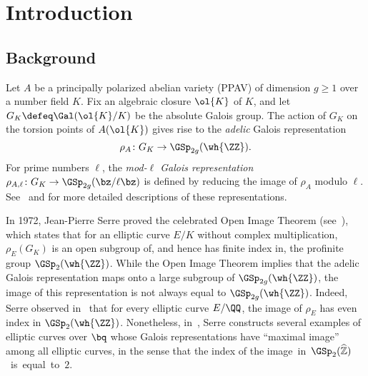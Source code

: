 \section{Introduction}
\subsection{Background}
\label{subsection:intro-background}
Let $A$ be a principally polarized abelian variety (PPAV) of dimension $g \geq 1$
over a number field $K$.
Fix an algebraic closure $\ol{K}$ of $K$, and let $G_K \defeq \Gal(\ol{K}/K)$ be the absolute Galois group. 
The action of $G_K$ on the torsion points of $A(\ol{K})$ gives rise to the 
\emph{adelic} Galois representation
$$\rho_A \colon G_K \to\GSp_{2g}(\wh{\ZZ}).$$
For prime numbers $\ell$, the \emph{mod-$\ell$ Galois representation} $\rho_{A,\ell} \colon G_K \to \GSp_{2g}(\bz/\ell\bz)$ is defined by reducing the image of $\rho_A$ modulo $\ell$.
See~\cite[Section 2.2]{seaweed} and
\cite[Section 3.1]{landesman-swaminathan-tao-xu:rational-families} for more detailed descriptions of these representations.

In 1972, Jean-Pierre Serre proved the celebrated Open Image Theorem (see~\cite{causalrelationship}), which states that for an elliptic curve $E/K$ without complex multiplication, $\rho_E(G_K)$ is an open subgroup of, and hence has finite index in, the profinite group $\GSp_{2}(\wh{\ZZ})$. 
While the Open Image Theorem implies that the adelic Galois representation maps onto a large subgroup of $\GSp_{2g}(\wh{\ZZ})$, the image of this representation is not always equal to $\GSp_{2g}(\wh{\ZZ})$. 
Indeed, Serre observed in~\cite[Proposition 22]{causalrelationship} that for every elliptic curve $E/\QQ$, the image of $\rho_E$ has even index in $\GSp_2(\wh{\ZZ})$.
Nonetheless, in~\cite[Sections 5.5.6-8]{causalrelationship},
Serre constructs several examples of elliptic curves over $\bq$
whose Galois representations have ``maximal image'' among all elliptic curves, in the sense that the index of the \mbox{image in $\GSp_2(\widehat{\mathbb Z})$ is equal to $2$.}

